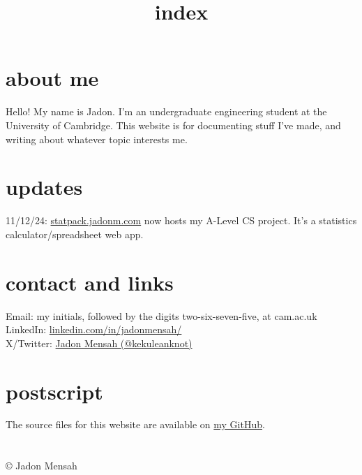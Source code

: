\documentclass{article}
\begin{document}
	\title{index}
		\date{}
		\maketitle
		\section{about me}
		Hello! My name is Jadon. I'm an undergraduate engineering student at the University of Cambridge. This website is for documenting stuff I've made, and writing about whatever topic interests me.
		
		\section{updates}
		11/12/24: \href{https://statpack.jadonm.com/}{statpack.jadonm.com} now hosts my A-Level CS project. It's a statistics calculator/spreadsheet web app.
		
		\section{contact and links}
		Email: my initials, followed by the digits two-six-seven-five, at cam.ac.uk\\
		LinkedIn: \href{https://www.linkedin.com/in/jadonmensah/}{linkedin.com/in/jadonmensah/}\\
		X/Twitter: \href{https://x.com/kekuleanknot}{Jadon Mensah (@kekuleanknot)} 
		\section{postscript}
		The source files for this website are available on \href{https://github.com/jadonmensah/jadonm.com/}{my GitHub}.
		\section{}
		\copyright{} Jadon Mensah
\end{document}
